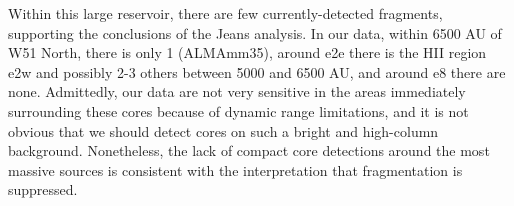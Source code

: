 \documentclass{emulateapj}
\begin{document}




Within this large reservoir, there are few currently-detected fragments,
supporting the conclusions of the Jeans analysis.
In our data, within 6500 AU of W51 North, there is only 1 (ALMAmm35), around
e2e there is the HII region e2w and possibly 2-3 others between 5000 and 6500
AU, and around e8 there are none.  Admittedly, our data are not very sensitive
in the areas immediately surrounding these cores because of dynamic
range limitations, and it is not obvious that we should detect cores on such
a bright and high-column background.  Nonetheless, the lack of compact core
detections around the most massive sources is consistent with the interpretation
that fragmentation is suppressed.
\end{document}
